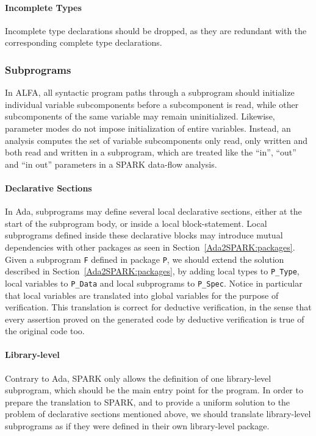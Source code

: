 \documentclass{article}
\begin{document}
\paragraph{Incomplete Types}

Incomplete type declarations should be dropped, as they are redundant with the
corresponding complete type declarations.

\subsubsection{Subprograms}
\label{Ada2SPARK:subprograms}

 In ALFA, all syntactic
program paths through a subprogram should initialize individual variable
subcomponents before a subcomponent is read, while other subcomponents of the
same variable may remain uninitialized. Likewise, parameter modes do not impose
initialization of entire variables. Instead, an analysis computes the set of
variable subcomponents only read, only written and both read and written in a
subprogram, which are treated like the ``in'', ``out'' and ``in out''
parameters in a SPARK data-flow analysis.

\paragraph{Declarative Sections}

In Ada, subprograms may define several local declarative sections, either at
the start of the subprogram body, or inside a local block-statement. Local
subprograms defined inside these declarative blocks may introduce mutual
dependencies with other packages as seen in
Section~\ref{Ada2SPARK:packages}. Given a subprogram \verb|F| defined in
package \verb|P|, we should extend the solution described in
Section~\ref{Ada2SPARK:packages}, by adding local types to \verb|P_Type|, local
variables to \verb|P_Data| and local subprograms to \verb|P_Spec|. Notice in
particular that local variables are translated into global variables for the
purpose of verification. This translation is correct for deductive
verification, in the sense that every assertion proved on the generated code by
deductive verification is true of the original code too.

\paragraph{Library-level}

Contrary to Ada, SPARK only allows the definition of one library-level
subprogram, which should be the main entry point for the program. In order to
prepare the translation to SPARK, and to provide a uniform solution to the
problem of declarative sections mentioned above, we should translate
library-level subprograms as if they were defined in their own library-level
package.
\end{document}
